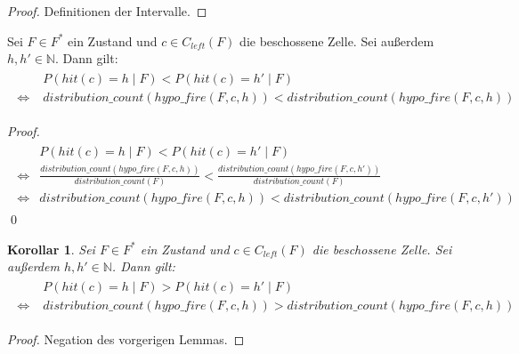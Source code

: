 \documentclass[a4paper,12pt]{llncs}
\newcommand{\N}{{\mathbb{N}}}
\numberwithin{equation}{section}
\newtheorem{korollar}{Korollar}
\begin{document}
\begin{proof}
Definitionen der Intervalle.
\end{proof}

\begin{lemma}
Sei $F\in F^*$ ein Zustand und $c \in C_{left}(F)$ die beschossene Zelle.
Sei außerdem $h,h' \in \N$.
Dann gilt:
\begin{align}
\begin{split}
&P(hit(c)=h \mid F) < P(hit(c)=h' \mid F) \\
\Leftrightarrow \; &distribution\_count(hypo\_fire(F, c, h)) < distribution\_count(hypo\_fire(F, c, h))
\nonumber
\end{split}
\end{align}
\end{lemma}

\begin{proof}
\begin{align}
\begin{split}
&P(hit(c)=h \mid F) < P(hit(c)=h' \mid F) \\
\Leftrightarrow
&\frac{distribution\_count(hypo\_fire(F,c, h))}{distribution\_count(F)} < \frac{distribution\_count(hypo\_fire(F,c, h'))}{distribution\_count(F)} \\
\Leftrightarrow
&distribution\_count(hypo\_fire(F,c, h)) < distribution\_count(hypo\_fire(F,c, h'))
\nonumber
\end{split}
\end{align}
\qed
\end{proof}

\begin{korollar}
Sei $F\in F^*$ ein Zustand und $c \in C_{left}(F)$ die beschossene Zelle.
Sei außerdem $h,h' \in \N$.
Dann gilt:
\begin{align}
\begin{split}
&P(hit(c)=h \mid F) > P(hit(c)=h' \mid F) \\
\Leftrightarrow \; &distribution\_count(hypo\_fire(F, c, h)) > distribution\_count(hypo\_fire(F, c, h))
\nonumber
\end{split}
\end{align}
\end{korollar}

\begin{proof}
Negation des vorgerigen Lemmas.
\end{proof}
\end{document}
